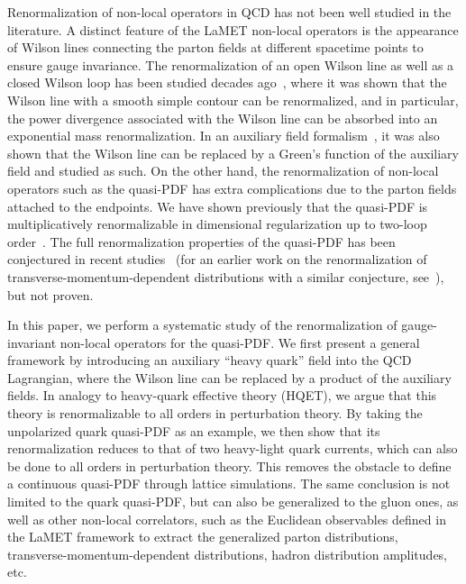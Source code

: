 Renormalization of non-local operators in QCD has not been well studied in the literature. A distinct feature of the LaMET non-local operators is the appearance of Wilson lines connecting the parton fields at different spacetime points to ensure gauge invariance.
The renormalization of an open Wilson line as well as a closed Wilson loop has been studied decades ago~\cite{Dotsenko:1979wb,Craigie:1980qs,Dorn:1986dt}, where it was shown that the Wilson line with a smooth simple contour can be renormalized, and in particular, the power divergence associated with the Wilson line can be absorbed into an exponential mass renormalization. In an auxiliary field formalism~\cite{Dorn:1986dt}, it was also shown that the Wilson line can be replaced by a Green's function of the auxiliary field and studied as such. On the other hand, the renormalization of non-local operators such as the quasi-PDF has extra complications due to the parton fields attached to the endpoints.
We have shown previously that the quasi-PDF is multiplicatively renormalizable in dimensional regularization up to two-loop order~\cite{Ji:2015jwa}.
The full renormalization properties of the quasi-PDF has been conjectured in recent studies~\cite{Ishikawa:2016znu,Chen:2016fxx,Constantinou:2017sej,Alexandrou:2017huk,Chen:2017mzz,Stewart:2017ss} (for an earlier work on the renormalization of transverse-momentum-dependent distributions with a similar conjecture, see~\cite{Musch:2010ka}),
but not proven.

In this paper, we perform a systematic study of the renormalization of gauge-invariant non-local operators for the quasi-PDF. We first present a general framework by introducing an auxiliary ``heavy quark'' field into the QCD Lagrangian, where the Wilson line can be replaced by a product of the auxiliary fields. In analogy to heavy-quark effective theory (HQET), we argue that this theory is renormalizable to all orders in perturbation theory. By taking the unpolarized quark quasi-PDF as an example, we then show that its renormalization reduces to that of two heavy-light quark currents, which can also be done to all orders in perturbation theory. This removes
the obstacle to define a continuous quasi-PDF through lattice simulations. The same conclusion is not limited to the quark quasi-PDF, but can also be generalized to the gluon ones, as well as
other non-local correlators, such as the Euclidean observables defined in the LaMET framework to extract the generalized parton distributions,
transverse-momentum-dependent distributions, hadron distribution
amplitudes, etc.

